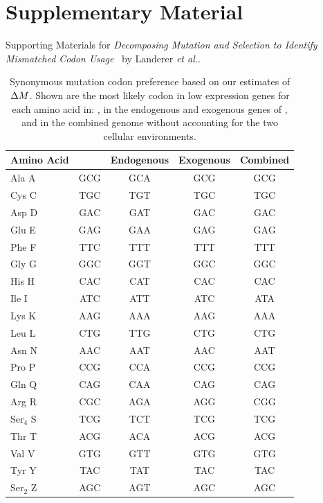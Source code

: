 \documentclass[fleqn,letterpaper]{article}
\begin{document}
\section*{Supplementary Material}

Supporting Materials for \emph{Decomposing Mutation and Selection to Identify Mismatched Codon Usage} \ by Landerer \emph{et al.}.

\begin{table}[h]
    \centering
    \caption{Synonymous mutation codon preference based on our estimates of ${\Delta M}$.
	 Shown are the most likely codon in low expression genes for each amino acid in: \gossypii, in the endogenous and exogenous genes of \kluyveri, and in the combined \kluyveri genome without accounting for the two cellular environments.}
\begin{tabular}{  l  c  c  c  c  }
\hline
	Amino Acid & \gossypii & Endogenous & Exogenous & Combined \\ \hline
	Ala A & GCG & GCA & GCG & GCG \\ 
	Cys C & TGC & TGT & TGC & TGC \\ 
	Asp D & GAC & GAT & GAC & GAC \\ 
	Glu E & GAG & GAA & GAG & GAG \\ 
	Phe F & TTC & TTT & TTT & TTT \\ 
	Gly G & GGC & GGT & GGC & GGC \\ 
	His H & CAC & CAT & CAC & CAC \\ 
	Ile I & ATC & ATT & ATC & ATA \\ 
	Lys K & AAG & AAA & AAG & AAA \\ 
	Leu L & CTG & TTG & CTG & CTG \\ 
	Asn N & AAC & AAT & AAC & AAT \\ 
	Pro P & CCG & CCA & CCG & CCG \\ 
	Gln Q & CAG & CAA & CAG & CAG \\ 
	Arg R & CGC & AGA & AGG & CGG \\ 
	Ser$_4$ S & TCG & TCT & TCG & TCG \\
	Thr T & ACG & ACA & ACG & ACG \\ 
	Val V & GTG & GTT & GTG & GTG \\ 
	Tyr Y & TAC & TAT & TAC & TAC \\ 
	Ser$_2$ Z & AGC & AGT & AGC & AGC \\ \hline
\end{tabular}
    \label{tab:codon_pref_dm}
\end{table}
\end{document}
